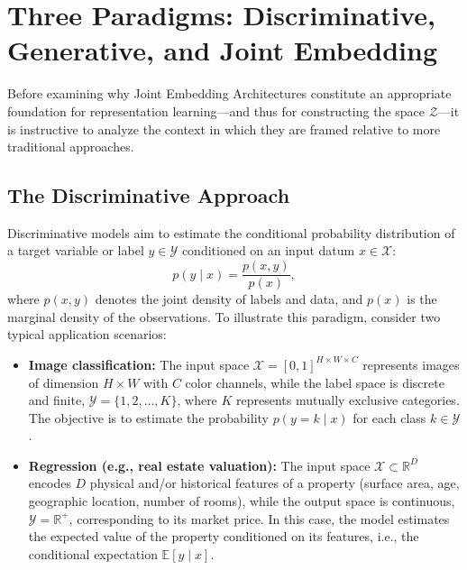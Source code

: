 \documentclass[11pt, oneside, openany]{book}
\begin{document}
\section{Three Paradigms: Discriminative, Generative, and Joint Embedding}
\label{sec:1.2}

Before examining why Joint Embedding Architectures constitute an appropriate foundation for representation learning---and thus for constructing the space $\mathcal{Z}$---it is instructive to analyze the context in which they are framed relative to more traditional approaches.

\subsection{The Discriminative Approach}
\label{sec:1.2.1}

Discriminative models aim to estimate the conditional probability distribution of a target variable or label $y \in \mathcal{Y}$ conditioned on an input datum $x \in \mathcal{X}$:
\begin{equation}
\label{eq:1.1}
p(y \mid x) = \frac{p(x,y)}{p(x)},
\end{equation}
where $p(x,y)$ denotes the joint density of labels and data, and $p(x)$ is the marginal density of the observations. To illustrate this paradigm, consider two typical application scenarios:
\begin{itemize}
    \item \textbf{Image classification:} The input space $\mathcal{X} = [0,1]^{H \times W \times C}$ represents images of dimension $H \times W$ with $C$ color channels, while the label space is discrete and finite, $\mathcal{Y} = \{1, 2, \dots, K\}$, where $K$ represents mutually exclusive categories. The objective is to estimate the probability $p(y = k \mid x)$ for each class $k \in \mathcal{Y}$.
    \item \textbf{Regression (e.g., real estate valuation):} The input space $\mathcal{X} \subset \mathbb{R}^{D}$ encodes $D$ physical and/or historical features of a property (surface area, age, geographic location, number of rooms), while the output space is continuous, $\mathcal{Y} = \mathbb{R}^{+}$, corresponding to its market price. In this case, the model estimates the expected value of the property conditioned on its features, i.e., the conditional expectation $\mathbb{E}[y \mid x]$.
\end{itemize}
\end{document}
